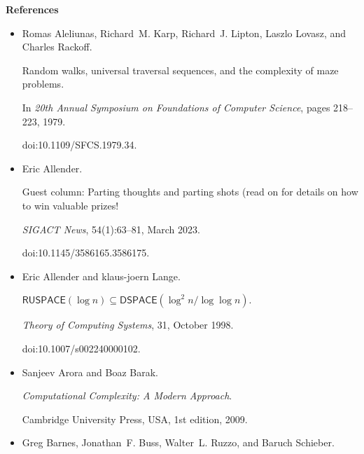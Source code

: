 \documentclass[10pt,a4paper]{article}
\begin{document}
\par\medskip\noindent\textbf{References}\par



\begin{itemize}


\item[] 
[1]

Romas Aleliunas, Richard M. Karp, Richard J. Lipton, Laszlo Lovasz, and Charles
Rackoff.


Random walks, universal traversal sequences, and the complexity of
maze problems.


In \emph{20th Annual Symposium on Foundations of Computer Science},
pages 218–223, 1979.


doi:10.1109/SFCS.1979.34.





\item[] 
[2]

Eric Allender.


Guest column: Parting thoughts and parting shots (read on for details
on how to win valuable prizes!


\emph{SIGACT News}, 54(1):63–81, March 2023.


doi:10.1145/3586165.3586175.





\item[] 
[3]

Eric Allender and klaus-joern Lange.


$\mathsf{RUSPACE}(\log n)\subseteq\mathsf{DSPACE}(\log^{2}n/\log\log n)$.


\emph{Theory of Computing Systems}, 31, October 1998.


doi:10.1007/s002240000102.





\item[] 
[4]

Sanjeev Arora and Boaz Barak.


\emph{Computational Complexity: A Modern Approach}.


Cambridge University Press, USA, 1st edition, 2009.





\item[] 
[5]

Greg Barnes, Jonathan F. Buss, Walter L. Ruzzo, and Baruch Schieber.



\end{itemize}
\end{document}
